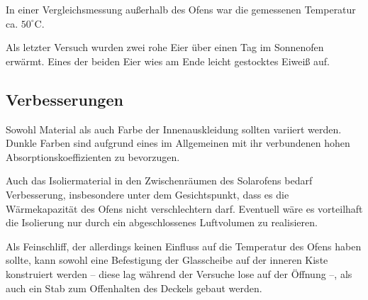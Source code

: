 In einer Vergleichsmessung außerhalb des Ofens war die gemessenen Temperatur ca. $50^\circ$C.

Als letzter Versuch wurden zwei rohe Eier über einen Tag im Sonnenofen erwärmt. Eines der beiden Eier wies am Ende leicht gestocktes Eiweiß auf. %

\subsection{Verbesserungen}

Sowohl Material als auch Farbe der Innenauskleidung sollten variiert werden. Dunkle Farben sind aufgrund eines im Allgemeinen mit ihr verbundenen hohen Absorptionskoeffizienten zu bevorzugen. 

Auch das Isoliermaterial in den Zwischenräumen des Solarofens bedarf Verbesserung, insbesondere unter dem Gesichtspunkt, dass es die Wärmekapazität des Ofens nicht verschlechtern darf. Eventuell wäre es vorteilhaft die Isolierung nur durch ein abgeschlossenes Luftvolumen zu realisieren.

Als Feinschliff, der allerdings keinen Einfluss auf die Temperatur des Ofens haben sollte, kann sowohl eine Befestigung der Glasscheibe auf der inneren Kiste konstruiert werden -- diese lag während der Versuche lose auf der Öffnung --, als auch ein Stab zum Offenhalten des Deckels gebaut werden.